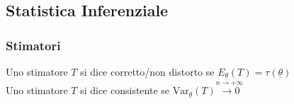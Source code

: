 \documentclass[10pt,a4paper]{article}
\begin{document}
\begin{multicols}{2}
\subsection*{Statistica Inferenziale}

\subsubsection*{Stimatori}
Uno stimatore $T$ si dice corretto/non distorto se $E_{\underline{\theta}} (T) = \tau (\underline{\theta})$\\
Uno stimatore $T$ si dice consistente se $\text{Var}_{\underline{\theta}}(T) \overset{n\to +\infty}{\longrightarrow 0}$


\end{multicols}
\end{document}
